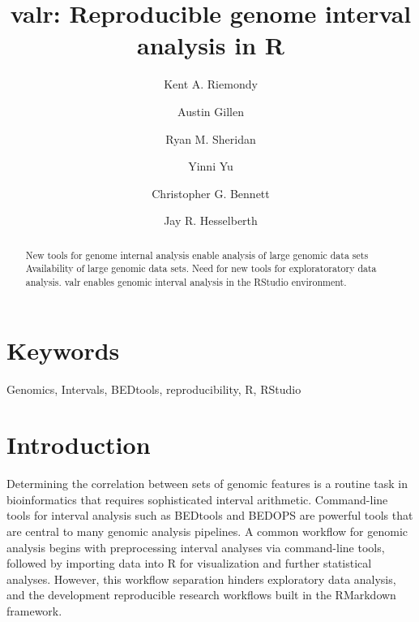 \documentclass[9pt,a4paper]{extarticle}
\begin{document}
\pagestyle{front}

\title{valr: Reproducible genome interval analysis in R}
\author[1]{Kent A. Riemondy}
\author[1]{Austin Gillen}
\author[2]{Ryan M. Sheridan}
\author[2]{Yinni Yu}
\author[3]{Christopher G. Bennett}
\author[1,2,*]{Jay R. Hesselberth}


\maketitle
\thispagestyle{front}

\begin{abstract}
New tools for genome internal analysis enable analysis of large genomic data sets
Availability of large genomic data sets. Need for new tools for exploratoratory data analysis. valr enables genomic interval analysis in the RStudio environment.
\end{abstract}

\section*{Keywords}

Genomics, Intervals, BEDtools, reproducibility, R, RStudio

\clearpage
\pagestyle{main}
\section*{Introduction}

Determining the correlation between sets of genomic features is a routine task in bioinformatics that requires sophisticated interval arithmetic. Command-line tools for interval analysis such as BEDtools \cite{quinlan_bedtools:_2010} and BEDOPS \cite{neph_bedops:_2012} are powerful tools that are central to many genomic analysis pipelines. A common workflow for genomic analysis begins with preprocessing interval analyses via command-line tools, followed by importing data into R for visualization and further statistical analyses. However, this workflow separation hinders exploratory data analysis, and the development reproducible research workflows built in the RMarkdown framework. 
\end{document}
